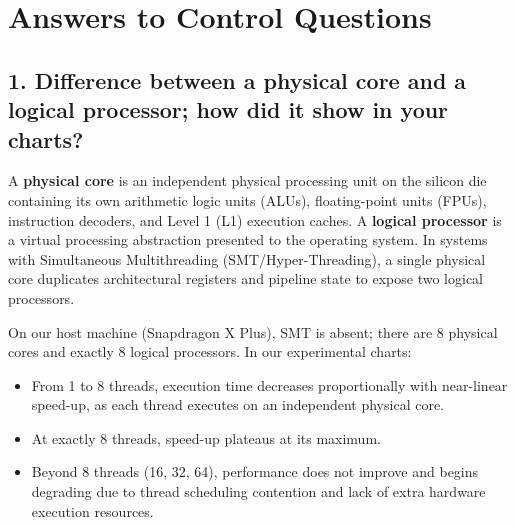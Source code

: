 \documentclass[12pt,a4paper]{article}
\begin{document}
\section{Answers to Control Questions}

\subsection{1. Difference between a physical core and a logical processor; how did it show in your charts?}
A \textbf{physical core} is an independent physical processing unit on the silicon die containing its own arithmetic logic units (ALUs), floating-point units (FPUs), instruction decoders, and Level 1 (L1) execution caches. 
A \textbf{logical processor} is a virtual processing abstraction presented to the operating system. In systems with Simultaneous Multithreading (SMT/Hyper-Threading), a single physical core duplicates architectural registers and pipeline state to expose two logical processors.

On our host machine (Snapdragon X Plus), SMT is absent; there are 8 physical cores and exactly 8 logical processors. In our experimental charts:
\begin{itemize}
    \item From 1 to 8 threads, execution time decreases proportionally with near-linear speed-up, as each thread executes on an independent physical core.
    \item At exactly 8 threads, speed-up plateaus at its maximum.
    \item Beyond 8 threads (16, 32, 64), performance does not improve and begins degrading due to thread scheduling contention and lack of extra hardware execution resources.
\end{itemize}
\end{document}

